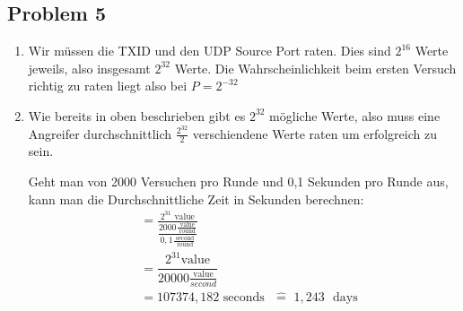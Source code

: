 \documentclass[12pt, german]{article}
\begin{document}
\subsection*{Problem 5}
      \begin{enumerate}[label=\alph*)]
      	\item Wir müssen die TXID und den UDP Source Port raten. Dies sind $2^{16}$ Werte jeweils, also insgesamt $2^{32}$ Werte. Die Wahrscheinlichkeit beim ersten Versuch richtig zu raten liegt also bei $P=2^{-32}$
		
		\item 	Wie bereits in oben beschrieben gibt es $2^{32}$ mögliche Werte, also muss eine Angreifer durchschnittlich $\frac{2^{32}}{2}$ verschiendene Werte raten um erfolgreich zu sein.
		
	Geht man von 2000 Versuchen pro Runde und 0,1 Sekunden pro Runde aus, kann man die Durchschnittliche Zeit in Sekunden berechnen: 
	\begin{align*}
		&=\frac{2^{31}\text{ value}}{\dfrac{2000 \frac{\text{ value}}{\text{ round}}}{0,1\frac{\text{ second}}{\text{ round}}}}  \\ &=\dfrac{2^{31}\text{value}}{20000\frac{\text{value}}{second}}  \\ 
		&= 107374,182 \text{ seconds  }  \, \, \widehat{=}\,\, 1,243 \,\,\text{ days} \\
   \end{align*}
      \end{enumerate}
      
   
   
  

   	
    
\end{document}
